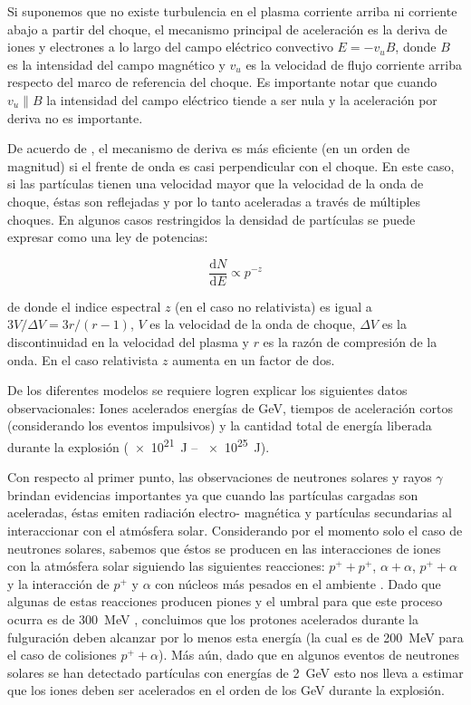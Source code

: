 \begin{itemize}
  Si suponemos que no existe turbulencia en el plasma corriente arriba ni corriente abajo a partir del choque, el mecanismo principal de aceleración es la deriva de iones y electrones a lo largo del campo eléctrico convectivo $E=-v _{u}B$, donde $B$ es la intensidad del campo magnético y $v_{u}$ es la velocidad de flujo corriente arriba respecto del marco de referencia del choque. Es importante notar que cuando $v_{u}\parallel B$ la intensidad del campo eléctrico tiende a ser nula y la aceleración por deriva no es importante.

  De acuerdo de \cite{ramaty87}, el mecanismo de deriva es más eficiente (en un orden de magnitud) si el frente de onda es casi perpendicular con el choque. En este caso, si las partículas tienen una velocidad mayor que la velocidad de la onda de choque, éstas son reflejadas y por lo tanto aceleradas a través de múltiples choques. En algunos casos restringidos la densidad de partículas se puede expresar como una ley de potencias:

  \begin{equation}
  \label{equ:shock-plaw}
  \frac{\mathrm{d}N}{\mathrm{d}E}\propto p^{-z}
  \end{equation}

  de donde el indice espectral $z$ (en el caso no relativista) es igual a $3V/\Delta V=3r/(r-1)$, $V$ es la velocidad de la onda de choque, $\Delta V$ es la discontinuidad en la velocidad del plasma y $r$ es la razón de compresión de la onda. En el caso relativista $z$ aumenta en un factor de dos.

\end{itemize}

De los diferentes modelos se requiere logren explicar los siguientes datos observacionales: Iones acelerados energías de \si{\giga\electronvolt}, tiempos de aceleración cortos (considerando los eventos impulsivos) y la cantidad total de energía liberada durante la explosión (\SI{e21}{\joule} -- \SI{e25}{\joule}).

Con respecto al primer punto, las observaciones de neutrones solares y rayos $\gamma$ brindan evidencias importantes ya que cuando las partículas cargadas son aceleradas, éstas emiten radiación electro-
magnética y partículas secundarias al interaccionar con el atmósfera solar. Considerando por el momento solo el caso de neutrones solares, sabemos que éstos se producen en las interacciones de iones con la atmósfera solar siguiendo las siguientes reacciones: $p^{+}+p^{+}$, $\alpha+\alpha$, $p^{+}+\alpha$ y la interacción de $p^{+}$ y $\alpha$ con núcleos más pesados en el ambiente \cite{diegophd}. Dado que algunas de estas reacciones producen piones y el umbral para que este proceso ocurra es de \SI{300}{\mega\electronvolt} \cite{tsuchiyaphd}, concluimos que los protones acelerados durante la fulguración deben alcanzar por lo menos esta energía (la cual es de \SI{200}{\mega\electronvolt} para el caso de colisiones $p^{+}+\alpha$). Más aún, dado que en algunos eventos de neutrones solares se han detectado partículas con energías de \SI{2}{\giga\electronvolt} esto nos lleva a estimar que los iones deben ser acelerados en el orden de los \si{\giga\electronvolt} durante la explosión.

